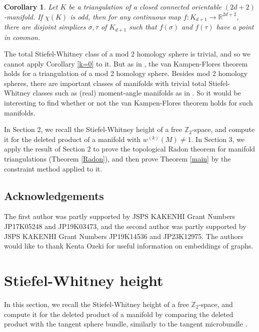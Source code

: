 \documentclass[amsfonts]{amsart}
\numberwithin{equation}{section}
\newtheorem{corollary}[theorem]{Corollary}
\theoremstyle{definition}
\theoremstyle{remark}
\newcommand{\Z}{\mathbb{Z}}
\newcommand{\R}{\mathbb{R}}
\begin{document}
  \begin{corollary}
    Let $K$ be a triangulation of a closed connected orientable $(2d+2)$-manifold. If $\chi(K)$ is odd, then for any continuous map $f\colon K_{d+1}\to\R^{2d+2}$, there are disjoint simplices $\sigma,\tau$ of $K_{d+1}$ such that $f(\sigma)$ and $f(\tau)$ have a point in common.
  \end{corollary}



The total Stiefel-Whitney class of a mod 2 homology sphere is trivial, and so we cannot apply Corollary \ref{k=0} to it. But as in \cite{HKK}, the van Kampen-Flores theorem holds for a triangulation of a mod 2 homology sphere. Besides mod 2 homology spheres, there are important classes of manifolds with trivial total Stiefel-Whitney classes such as (real) moment-angle manifolds as in \cite{HKK}. So it would be interesting to find whether or not the van Kampen-Flores theorem holds for such manifolds.



  In Section 2, we recall the Stiefel-Whitney height of a free $\Z_2$-space, and compute it for the deleted product of a manifold with $w^{(k)}(M)\ne 1$. In Section 3, we apply the result of Section 2 to prove the topological Radon theorem for manifold triangulations (Theorem \ref{Radon}), and then prove Theorem \ref{main} by the constraint method \cite{BFZ} applied to it.



\subsection*{Acknowledgements}
The first author was partly supported by JSPS KAKENHI Grant Numbers JP17K05248 and JP19K03473, and the second author was partly supported by JSPS KAKENHI Grant Numbers JP19K14536 and JP23K12975.
The authors would like to thank Kenta Ozeki for useful information on embeddings of graphs.




  \section{Stiefel-Whitney height}

  In this section, we recall the Stiefel-Whitney height of a free $\Z_2$-space, and compute it for the deleted product of a manifold by comparing the deleted product with the tangent sphere bundle, similarly to the tangent microbundle \cite{M1}.
\end{document}
